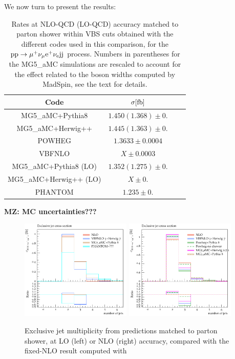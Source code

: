 We now turn to present the results:



\begin{table}[h!]
    \centering
    \begin{tabular}{c|c|c|c}
        Code  &  $\sigma[\rm{fb}]$  \\
        \hline
        {\sc MG5\_aMC}+{\sc Pythia8}&  $1.450 (1.368) \pm 0.$  \\
        {\sc MG5\_aMC}+{\sc Herwig++}&  $1.445 (1.363) \pm 0.$  \\
        {\sc POWHEG}  &  $1.3633 \pm 0.0004$  \\
        {\sc VBFNLO}  &  $X \pm 0.0003$  \\
        \hline
        {\sc MG5\_aMC}+{\sc Pythia8} (LO)&  $1.352 (1.275) \pm 0.$  \\
        {\sc MG5\_aMC}+{\sc Herwig++} (LO)&  $X  \pm 0.$  \\
        {\sc PHANTOM} &  $1.235  \pm 0.$  \\
    \end{tabular}
    \caption{\label{tab:wg1_NLOrates} Rates at NLO-QCD (LO-QCD) accuracy matched to parton shower within VBS cuts obtained with the different codes used in this comparison, 
    for the ${\rm p}{\rm p}\to\mu^+\nu_\mu{\rm e}^+\nu_{\rm e}{\rm j}{\rm j}$ process. Numbers in parentheses for the {\sc MG5\_aMC} simulations
    are rescaled to account for the effect related to the boson widths computed by {\sc MadSpin}, see the text for details.}
{\bf MZ: MC uncertainties???}
\end{table}

\begin{figure}[hbt]
\centering
\includegraphics[width=0.47\textwidth]{figures/LOPS/jetsexclusive.pdf}
\includegraphics[width=0.47\textwidth]{figures/NLOPS/jetsexclusive.pdf}
\caption{Exclusive jet multiplicity from predictions matched to parton shower, at LO (left) or NLO (right) accuracy, compared with the fixed-NLO result
    computed with }
\label{fig:PSnjet}
\end{figure}

